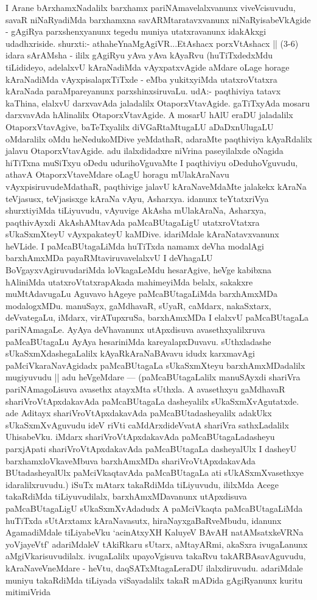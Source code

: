 \begin{artha}
I Arane bArxhamxNadalilx barxhamx pariNAmavelalxvanunx viveVcisuvudu, savaR niNaR\-yadiMda barxhamxna savARMtaratavxvanunx niNaRyisabeVkAgide - gAgiRya parxshenx\-yanunx tegedu muniya utatxravanunx idakAkxgi udadhxriside. shurxti:- athaheYnaMgAgiVR...EtA\-shacx porxVtAshacx || (3-6) idara sArAMsha - ililx gAgiRyu yAva yAva kAyaRvu (huTiTxdedxMdu tiLidideyo, adelalxvU kAraNadiMda vAyxpatxvAgide aMdare oLage horage kAraNadiMda vAyxpisalapxTiTxde - eMba yukitxyiMda utatxroVtatxra kAraNada paraMpareyanunx parxshinxsiruvaLu. udA:- paqthiviya tatavx kaThina, elalxvU darxvavAda jaladalilx OtaporxVtavAgide. gaTiTxyAda mosaru darxvavAda hAlinalilx OtaporxVta\-vAgide. A mosarU hAlU eraDU jaladalilx OtaporxVtavAgive, baTeTxyalilx diVGaR\-taMtugaLU aDaDxnUlugaLU oMdaralilx oMdu heNedukoMDive yeMdathaR, ada\-raMte paqthiviya kAyaRdalilx jalavu OtaporxVtavAgide. adu ilalxdidadxre niVrina paseyilalxde oNagida hiTiTxna muSiTxyu oDedu udurihoVguvaMte I paqthiviyu oDeduhoVguvudu, athavA OtaporxVtaveMdare oLagU horagu mUlakAraNavu vAyxpisiruvudeMdathaR, paqthivige jalavU kAraNaveMdaMte jalakekx kAraNa teVjasusx, teVjasisxge kAraNa vAyu, Asharxya. idanunx teYtatxriVya shurxtiyiMda tiLiyuvudu, vAyuvige AkAsha mUlakAraNa, Asharxya, paqthivAyxdi AkAshAMtavAda paMcaBUta\-gaLigU utatxroVtatxra sUkaSxmXteyU vAyxpakateyU kaMDive. idariMdale kAraNa\-tavxvanunx heVLide. I paMcaBUtagaLiMda huTiTxda namamx deVha modalAgi barxhAmxMDa payaRMtaviruvavelalxvU I deVhagaLU BoVgayxvAgiruvudariMda loVkagaLeMdu hesarAgive, heVge kabibxna hAliniMda utatxroVtatxrapAkada mahimeyiMda belalx, sakakxre muMtAdavugaLu Aguvavo hAgeye paMcaBUtagaLiMda barxhAmxMDa modalogxMDu. manuSayx, gaMdhavaR, sUyaR, caMdarx, nakaSxtarx, deVvategaLu, iMdarx, virATupxruSa, \-barxhAmxMDa I elalxvU paMcaBUtagaLa pariNAmagaLe. AyAya deVhavanunx utApxdi\-suva avasethxyalilxruva paMcaBUtagaLu AyAya hesariniMda kareyalapxDuvavu. sUthxladashe sUkaSxmXdashegaLalilx kAyaRkAraNaBAvavu idudx karxmavAgi paMciVkaraNa\-vAgidadx paMcaBUtagaLa sUkaSxmXteyu barxhAmxMDadalilx mugiyuvudu || adu \break heVgeMdare --- (paMcaBUtagaLalilx manuSAyxdi shariVra pariNAmagoLisuva avasethx atayxMta sUthxla. A avasethxyu gaMdhavaR shariVroVtApxdakavAda paMcaBUtagaLa dashe\-yalilx sUkaSxmXvAgutatxde. ade Aditayx shariVroVtApxdakavAda paMcaBUtadasheyalilx adakUkx sUkaSxmXvAguvudu ideV riVti caMdArxdideVvatA shariVra sathxLadalilx Uhisa\-beVku. iMdarx shariVroVtApxdakavAda paMcaBUtagaLadasheyu parxjApati shariVroVtApx\-dakavAda paMcaBUtagaLa dasheyalUlx I dasheyU barxhamxloVkaveMbuva barxhAmxMDa shariVroVtApxdakavAda BUtadasheyalUlx paMciVkaqtavAda paMcaBUtagaLa ati sUkASxmXvasethxye idaralilxruvudu.) iSuTx mAtarx takaRdiMda tiLiyuvudu, ililxMda Acege takaRdiMda tiLiyuvudilalx, barxhAmxMDavanunx utApxdisuva paMcaBUtagaLigU sUkaSxmXvAdadudx A paMciVkaqta paMcaBUtagaLiMda huTiTxda sUtArxtamx kAraNavasutx, hiraNayxgaBaRveMbudu, idanunx AgamadiMdale tiLiyabeVku `acinAtxyXH KaluyeV BAvAH natAMsatxkeVRNa yoVjayeVtf' adariMdaleV tAkiRkaru sUtarx, aMtayARmi, akaSxra ivugaLanunx aMgiVkarisuvudilalx. ivugaLalilx upayoVgisuva takaRvu takARBAsavAguvudu, kAraNaveVneMdare - heVtu, daqSATxMtagaLeraDU ilalxdiruvudu. adariMdale muniyu takaRdiMda tiLiyada viSayadalilx takaR mADida gAgiRyanunx kuritu mitimiVrida 
\end{artha}

